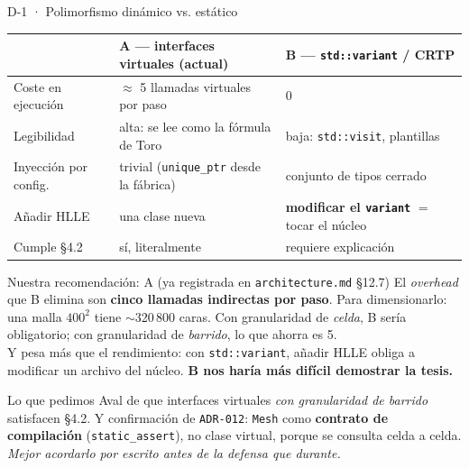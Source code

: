 \documentclass[aspectratio=169,10pt]{beamer}
\newcommand{\cod}[1]{\texttt{\small #1}}
\begin{document}
\begin{frame}[shrink]{D-1 · Polimorfismo dinámico vs. estático}
  \centering\scriptsize
  \begin{tabular}{@{}lll@{}}
    \toprule
    & \textbf{A — interfaces virtuales (actual)} & \textbf{B — \cod{std::variant} / CRTP} \\
    \midrule
    Coste en ejecución    & $\approx$ 5 llamadas virtuales por paso & 0 \\
    Legibilidad           & alta: se lee como la fórmula de Toro & baja: \cod{std::visit}, plantillas \\
    Inyección por config. & trivial (\cod{unique\_ptr} desde la fábrica) & conjunto de tipos cerrado \\
    Añadir HLLE           & una clase nueva & \textbf{modificar el \cod{variant}} $=$ tocar el núcleo \\
    Cumple §4.2           & sí, literalmente & requiere explicación \\
    \bottomrule
  \end{tabular}

  \vspace{0.6em}
  \begin{exampleblock}{Nuestra recomendación: A (ya registrada en \cod{architecture.md} §12.7)}
    \small
    El \emph{overhead} que B elimina son \textbf{cinco llamadas indirectas por
    paso}. Para dimensionarlo: una malla $400^2$ tiene $\sim$320\,800 caras. Con
    granularidad de \emph{celda}, B sería obligatorio; con granularidad de
    \emph{barrido}, lo que ahorra es 5.
    \\[3pt]
    Y pesa más que el rendimiento: con \cod{std::variant}, añadir HLLE obliga a
    modificar un archivo del núcleo. \textbf{B nos haría más difícil demostrar la
    tesis.}
  \end{exampleblock}

  \begin{alertblock}{Lo que pedimos}
    \scriptsize
    Aval de que interfaces virtuales \emph{con granularidad de barrido} satisfacen
    §4.2. Y confirmación de \cod{ADR-012}: \cod{Mesh} como \textbf{contrato de
    compilación} (\cod{static\_assert}), no clase virtual, porque se consulta
    celda a celda. \emph{Mejor acordarlo por escrito antes de la defensa que
    durante.}
  \end{alertblock}
\end{frame}
\end{document}
